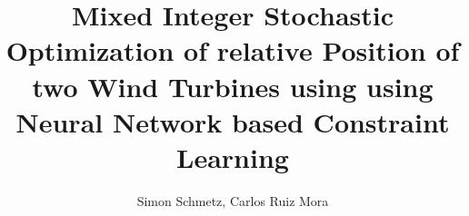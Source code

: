 \documentclass[preprint,12pt]{elsarticle}
\begin{document}
\begin{frontmatter}



\title{Mixed Integer Stochastic Optimization of relative Position of two Wind Turbines using using Neural Network based Constraint Learning} %


\author{Simon Schmetz, Carlos Ruiz Mora} %






\end{frontmatter}
\end{document}
